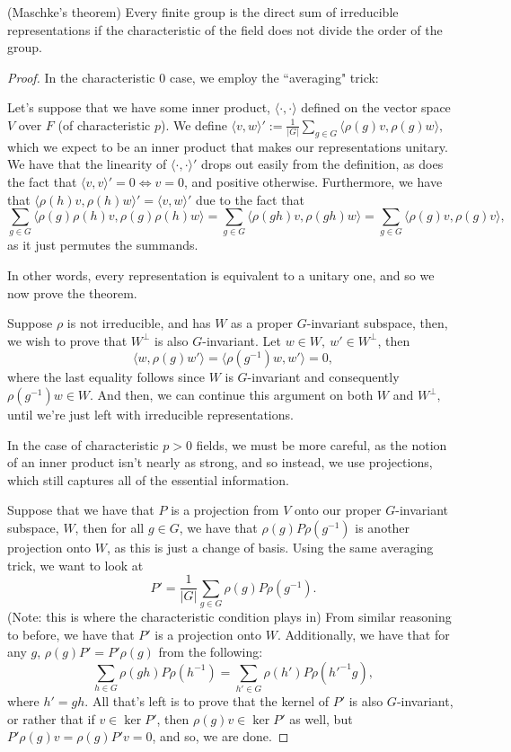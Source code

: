 \documentclass{article}
\begin{document}
\begin{theorem}
(Maschke's theorem) Every finite group is the direct sum of irreducible representations if the characteristic of the field does not divide the order of the group.
\end{theorem}
\begin{proof}

In the characteristic $0$ case, we employ the ``averaging" trick:

Let's suppose that we have some inner product, $\langle \cdot , \cdot \rangle$ defined on the vector space $V$ over $F$ (of characteristic $p$). We define $\langle v, w \rangle' := \frac{1}{|G|} \sum_{g \in G} \langle \rho(g)v , \rho(g)w \rangle,$ which we expect to be an inner product that makes our representations unitary. We have that the linearity of $\langle \cdot, \cdot \rangle '$ drops out easily from the definition, as does the fact that $\langle v,v \rangle' = 0 \iff v = 0$, and positive otherwise. Furthermore, we have that $\langle \rho(h)v, \rho(h)w \rangle' = \langle v, w \rangle'$ due to the fact that $$\sum_{g \in G} \langle \rho(g)\rho(h)v, \rho(g)\rho(h)w \rangle = \sum_{g \in G} \langle \rho(gh)v, \rho(gh)w \rangle = \sum_{g \in G} \langle \rho(g)v, \rho(g)v\rangle,$$ as it just permutes the summands.

In other words, every representation is equivalent to a unitary one, and so we now prove the theorem.

Suppose $\rho$ is not irreducible, and has $W$ as a proper $G$-invariant subspace, then, we wish to prove that $W^\perp$ is also $G$-invariant. Let $w \in W, \ w' \in W^\perp$, then $$\langle w, \rho(g)w' \rangle = \langle \rho(g^{-1})w, w' \rangle  = 0,$$ where the last equality follows since $W$ is $G$-invariant and consequently $\rho(g^{-1})w \in W$. And then, we can continue this argument on both $W$ and $W^\perp,$ until we're just left with irreducible representations.

In the case of characteristic $p>0$ fields, we must be more careful, as the notion of an inner product isn't nearly as strong, and so instead, we use projections, which still captures all of the essential information.

Suppose that we have that $P$ is a projection from $V$ onto our proper $G$-invariant subspace, $W$, then for all $g \in G$, we have that $\rho(g)P\rho(g^{-1})$ is another projection onto $W$, as this is just a change of basis. Using the same averaging trick, we want to look at $$P' = \frac{1}{|G|} \sum_{g \in G} \rho(g)P\rho(g^{-1}).$$ (Note: this is where the characteristic condition plays in) From similar reasoning to before, we have that $P'$ is a projection onto $W$. Additionally, we have that for any $g$, $\rho(g)P'=P'\rho(g)$ from the following:
$$ \sum_{h \in G} \rho(gh)P\rho(h^{-1}) = \sum_{h' \in G} \rho(h')P\rho(h'^{-1}g),$$ where $h' = gh$. All that's left is to prove that the kernel of $P'$ is also $G$-invariant, or rather that if $v \in \ker P'$, then $\rho(g)v \in \ker P'$ as well, but $P'\rho(g)v = \rho(g)P'v=0$, and so, we are done.

\end{proof}
\end{document}
